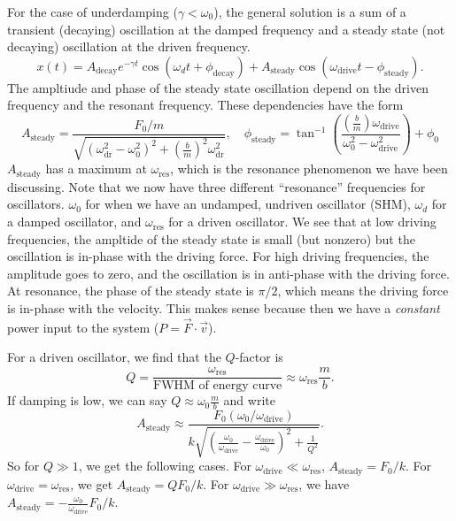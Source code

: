 \documentclass[../classical_mechanics.tex]{subfiles}
\begin{document}
        For the case of underdamping ($\gamma<\omega_0$), the general solution is a sum of a transient (decaying) oscillation at the damped frequency and a steady state (not decaying) oscillation at the driven frequency.
        \begin{equation}
            x(t)=A_\text{decay}e^{-\gamma t}\cos(\omega_d t+\phi_\text{decay})+A_\text{steady}\cos(\omega_\text{drive}t-\phi_\text{steady}).
        \end{equation}
        The ampltiude and phase of the steady state oscillation depend on the driven frequency and the resonant frequency.
        These dependencies have the form
        \begin{equation}
            A_\text{steady}=\frac{F_0/m}{\sqrt{(\omega_\text{dr}^2-\omega_0^2)^2+\left(\frac{b}{m}\right)^2\omega_\text{dr}^2}},\quad\phi_\text{steady}=\tan^{-1}\left(\frac{\left(\frac{b}{m}\right)\omega_\text{drive}}{\omega_0^2-\omega_\text{drive}^2}\right)+\phi_0
        \end{equation}
        $A_\text{steady}$ has a maximum at $\omega_\text{res}$, which is the resonance phenomenon we have been discussing.
        Note that we now have three different ``resonance'' frequencies for oscillators.
        $\omega_0$ for when we have an undamped, undriven oscillator (SHM), $\omega_d$ for a damped oscillator, and $\omega_\text{res}$ for a driven oscillator.
        We see that at low driving frequencies, the ampltide of the steady state is small (but nonzero) but the oscillation is in-phase with the driving force.
        For high driving frequencies, the amplitude goes to zero, and the oscillation is in anti-phase with the driving force.
        At resonance, the phase of the steady state is $\pi/2$, which means the driving force is in-phase with the velocity.
        This makes sense because then we have a \textit{constant} power input to the system ($P=\vec{F}\cdot\vec{v}$).

        For a driven oscillator, we find that the $Q$-factor is
        \begin{equation}
            Q=\frac{\omega_\text{res}}{\text{FWHM of energy curve}}\approx\omega_\text{res}\frac{m}{b}.
        \end{equation}
        If damping is low, we can say $Q\approx\omega_0\frac{m}{b}$ and write
        \begin{equation}
            A_\text{steady}\approx\frac{F_0(\omega_0/\omega_\text{drive})}{k\sqrt{\left(\frac{\omega_0}{\omega_\text{drive}}-\frac{\omega_\text{drive}}{\omega_0}\right)^2+\frac{1}{Q^2}}}.
        \end{equation}
        So for $Q\gg 1$, we get the following cases.
        For $\omega_\text{drive}\ll\omega_\text{res}$, $A_\text{steady}=F_0/k$.
        For $\omega_\text{drive}=\omega_\text{res}$, we get $A_\text{steady}=QF_0/k$.
        For $\omega_\text{drive}\gg\omega_\text{res}$, we have $A_\text{steady}=-\frac{\omega_0}{\omega_\text{drive}}F_0/k$.
\end{document}
